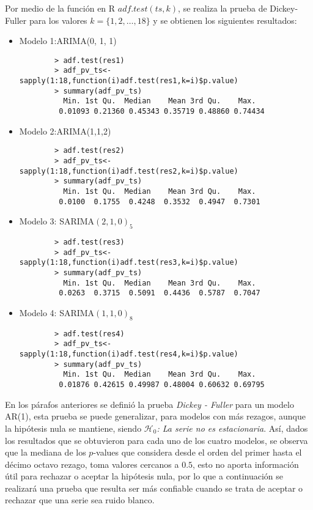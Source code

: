 \documentclass{article}
\theoremstyle{remark}
\begin{document}
Por medio de la función en R $adf.test(ts,k)$, se realiza la prueba de Dickey- Fuller para los valores $k= \{1, 2,\hdots,18\}$ y se obtienen los siguientes resultados:
\begin{itemize}
    \item Modelo 1:ARIMA(0, 1, 1)
    \begin{verbatim}
        > adf.test(res1)
        > adf_pv_ts<-sapply(1:18,function(i)adf.test(res1,k=i)$p.value)
        > summary(adf_pv_ts)   
          Min. 1st Qu.  Median    Mean 3rd Qu.    Max. 
         0.01093 0.21360 0.45343 0.35719 0.48860 0.74434
        \end{verbatim}
        \item Modelo 2:ARIMA(1,1,2)
    \begin{verbatim}
        > adf.test(res2)
        > adf_pv_ts<-sapply(1:18,function(i)adf.test(res2,k=i)$p.value)
        > summary(adf_pv_ts)   
          Min. 1st Qu.  Median    Mean 3rd Qu.    Max. 
         0.0100  0.1755  0.4248  0.3532  0.4947  0.7301
    \end{verbatim}
        \item Modelo 3: SARIMA\((2,1,0)_5\)
    \begin{verbatim}
        > adf.test(res3)
        > adf_pv_ts<-sapply(1:18,function(i)adf.test(res3,k=i)$p.value)
        > summary(adf_pv_ts)   
          Min. 1st Qu.  Median    Mean 3rd Qu.    Max. 
         0.0263  0.3715  0.5091  0.4436  0.5787  0.7047 
    \end{verbatim}
    \item Modelo 4: SARIMA\((1,1,0)_8\)
    \begin{verbatim}
        > adf.test(res4)
        > adf_pv_ts<-sapply(1:18,function(i)adf.test(res4,k=i)$p.value)
        > summary(adf_pv_ts)   
          Min. 1st Qu.  Median    Mean 3rd Qu.    Max. 
         0.01876 0.42615 0.49987 0.48004 0.60632 0.69795
    \end{verbatim}
\end{itemize}

En los párafos anteriores se definió la prueba \textit{Dickey - Fuller} para un modelo AR(1), esta prueba se puede generalizar, para modelos con más rezagos, aunque la hipótesis nula se mantiene, siendo \textit{$\mathscr{H}_0$: La serie no es estacionaria}. Así, dados los resultados que se obtuvieron para cada uno de los cuatro modelos, se observa que la mediana de los \(p\)-values que considera desde el orden del primer hasta el décimo octavo rezago, toma valores cercanos a $0.5$, esto no aporta información útil para rechazar o aceptar la hipótesis nula, por lo que a continuación se realizará una prueba que resulta ser más confiable cuando se trata de aceptar o rechazar que una serie sea ruido blanco.
\end{document}
